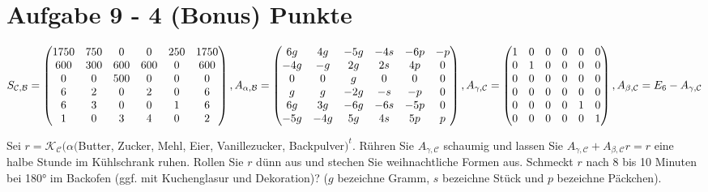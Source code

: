 \section*{Aufgabe 9 - 4 (Bonus) Punkte}
$S_{\mathcal{C},\mathcal{B}} = \begin{pmatrix}
1750 & 750 & 0&0&250&1750\\
600&300&600&600&0&600\\
0&0&500&0&0&0\\
6&2&0&2&0&6\\
6&3&0&0&1&6\\
1&0&3&4&0&2
\end{pmatrix}, A_{\alpha,\mathcal{B}} = \begin{pmatrix}
6g&4g&-5g&-4s&-6p&-p\\
-4g&-g&2g&2s&4p&0\\
0&0&g&0&0&0\\
g&g&-2g&-s&-p&0\\
6g&3g&-6g&-6s&-5p&0\\
-5g&-4g&5g&4s&5p&p
\end{pmatrix},\\
 A_{\gamma,\mathcal{C}} = \begin{pmatrix}
1&0&0&0&0&0\\
0&1&0&0&0&0\\
0&0&0&0&0&0\\
0&0&0&0&0&0\\
0&0&0&0&1&0\\
0&0&0&0&0&1\\
\end{pmatrix}, 
A_{\beta,\mathcal{C}} = E_6 - A_{\gamma,\mathcal{C}} $

Sei $r = \mathcal{K}_{\mathcal{C}}(\alpha($Butter, Zucker, Mehl, Eier, Vanillezucker, Backpulver$)^t$. Rühren Sie $A_{\gamma,\mathcal{C}}$ schaumig und lassen Sie $A_{\gamma,\mathcal{C}} + A_{\beta,\mathcal{C}} r = r$ eine halbe Stunde im Kühlschrank ruhen. Rollen
Sie $r$ dünn aus und stechen Sie weihnachtliche Formen aus.
Schmeckt $r$ nach 8 bis 10 Minuten bei 180° im Backofen (ggf. mit Kuchenglasur und Dekoration)?
($g$ bezeichne Gramm, $s$ bezeichne Stück und $p$ bezeichne Päckchen).

